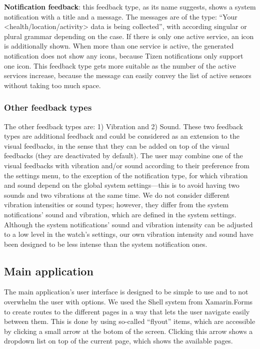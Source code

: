 \documentclass[conference, a4paper, 10pt, twocolumn]{IEEEtran}
\begin{document}
\textbf{Notification feedback}: this feedback type, as its name suggests, shows a system notification with a title and a message. The messages are of the type: ``Your <health/location/activity> data is being collected'', with according singular or plural grammar depending on the case. If there is only one active service, an icon is additionally shown. When more than one service is active, the generated notification does not show any icons, because Tizen notifications only support one icon. This feedback type gets more suitable as the number of the active services increase, because the message can easily convey the list of active sensors without taking too much space.

\subsubsection{Other feedback types}
The other feedback types are: 1) Vibration and 2) Sound. These two feedback types are additional feedback and could be considered as an extension to the visual feedbacks, in the sense that they can be added on top of the visual feedbacks (they are deactivated by default). The user may combine one of the visual feedbacks with vibration and/or sound according to their preference from the settings menu, to the exception of the notification type, for which vibration and sound depend on the global system settings---this is to avoid having two sounds and two vibrations at the same time. We do not consider different vibration intensities or sound types; however, they differ from the system notifications' sound and vibration, which are defined in the system settings. Although the system notifications' sound and vibration intensity can be adjusted to a low level in the watch's settings, our own vibration intensity and sound have been designed to be less intense than the system notification ones.

\subsection{Main application}
The main application's user interface is designed to be simple to use and to not overwhelm the user with options. We used the Shell system from Xamarin.Forms to create routes to the different pages in a way that lets the user navigate easily between them. This is done by using so-called ``flyout'' items, which are accessible by clicking a small arrow at the botom of the screen. Clicking this arrow shows a dropdown list on top of the current page, which shows the available pages.
\end{document}
